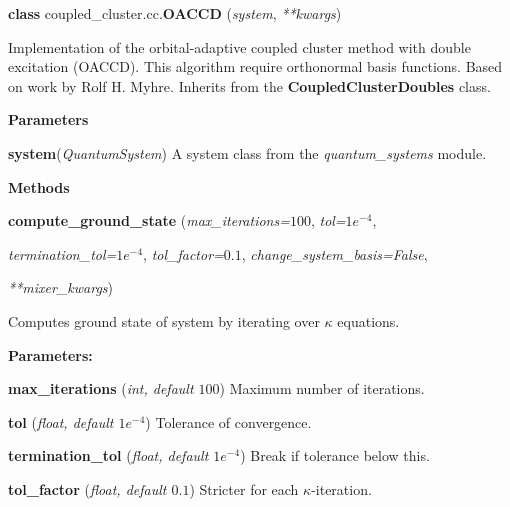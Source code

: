 \begin{tcolorbox}
    {\selectfont
    \textbf{class} coupled\_cluster.cc.\textbf{OACCD}
    (\emph{system}, \emph{**kwargs})

    \vspace{1em}
    Implementation of the orbital-adaptive coupled cluster method with double excitation
    (OACCD).
    This algorithm require orthonormal basis functions. Based on work by Rolf H. 
    Myhre\cite{myhre2018demonstrating}. Inherits from the \textbf{CoupledClusterDoubles} class.

    \vspace{1em}
    \textbf{Parameters}

    \hspace{2em}\textbf{system}(\emph{QuantumSystem}) A system class from the 
        \emph{quantum\_systems} module.

    \vspace{1em} 
    \textbf{Methods}

    \hspace{2em} \textbf{compute\_ground\_state}
        (\emph{max\_iterations=$100$}, \emph{tol=$1e^{-4}$},

        \hspace{3em} \emph{termination\_tol=$1e^{-4}$}, \emph{tol\_factor=$0.1$},
        \emph{change\_system\_basis=False},
        
        \hspace{3.2em}\emph{**mixer\_kwargs})

        \begin{adjustwidth}{4em}{}
        Computes ground state of system by iterating over $\kappa$ equations.

        \textbf{Parameters:} 

            \hspace{1.5em}\textbf{max\_iterations} (\emph{int, default $100$}) 
            Maximum number of iterations.

            \hspace{1.5em}\textbf{tol} (\emph{float, default $1e^{-4}$})
            Tolerance of convergence.

            \hspace{1.5em}\textbf{termination\_tol} (\emph{float, default $1e^{-4}$})
            Break if tolerance below this.

            \hspace{1.5em}\textbf{tol\_factor} (\emph{float, default $0.1$})
            Stricter for each $\kappa$-iteration.


\end{adjustwidth}}
\end{tcolorbox}
